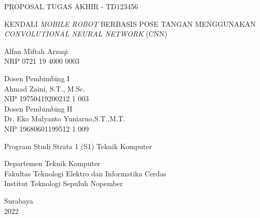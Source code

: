 \begin{large}
  PROPOSAL TUGAS AKHIR - TD123456
\end{large}

\vspace{\fill}

\begin{spacing}{1.5}
  \begin{Large}
    KENDALI \textit{MOBILE ROBOT} BERBASIS POSE TANGAN MENGGUNAKAN \textit{CONVOLUTIONAL NEURAL NETWORK} (CNN)
  \end{Large}
\end{spacing}

\vspace{\fill}

\begin{large}
  Alfan Miftah Arzaqi \\
  \textnormal{NRP 0721 19 4000 0003}
\end{large}

\vspace{\fill}

\begin{large}
  \textnormal{Dosen Pembimbing I} \\
  Ahmad Zaini, S.T., M.Sc. \\
  \textnormal{NIP 19750419200212 1 003} \\
  \textnormal{Dosen Pembimbing II} \\
  Dr. Eko Mulyanto Yuniarno,S.T.,M.T. \\
  \textnormal{NIP 19680601199512 1 009}
\end{large}

\vspace{\fill}

Program Studi Strata 1 (S1) Teknik Komputer \\

\normalfont

Departemen Teknik Komputer \\
Fakultas Teknologi Elektro dan Informatika Cerdas \\
Institut Teknologi Sepuluh Nopember

Surabaya \\
2022
